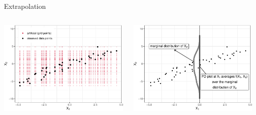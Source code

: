 \documentclass[11pt,compress,t,notes=noshow, aspectratio=169, xcolor=table]{beamer}
\begin{document}
\begin{frame}{Extrapolation}
\begin{columns}[T]
\begin{column}{0.5\textwidth}
\centering
\includegraphics[width=\textwidth]{figure/ale_scatter_grid}
\end{column}
\begin{column}{0.5\textwidth}
\centering
\includegraphics[width=\textwidth]{figure/ale_pdplot}
\end{column}
\end{columns}


\end{frame}
\end{document}
